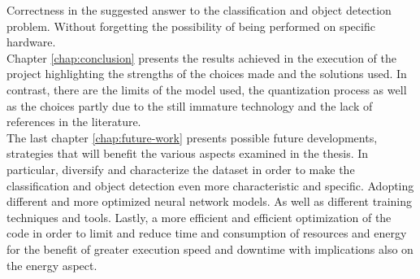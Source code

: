 Correctness in the suggested answer to the classification and object detection
problem. 
Without forgetting the possibility of being performed on specific hardware.\\
Chapter \ref{chap:conclusion} presents the results achieved in the execution of 
the project highlighting the strengths of the choices made and the solutions
used.
In contrast, there are the limits of the model used, the quantization process as
well as the choices partly due to the still immature technology and the lack of
references in the literature.\\
\noindent The last chapter \ref{chap:future-work} presents possible future
developments, strategies that will benefit the various aspects examined in the
thesis.
In particular, diversify and characterize the dataset in order to make the
classification and object detection even more characteristic and specific.
Adopting different and more optimized neural network models. 
As well as different training techniques and tools.
Lastly, a more efficient and efficient optimization of the code in order to
limit and reduce time and consumption of resources and energy for the benefit of
greater execution speed and downtime with implications also on the energy
aspect.
